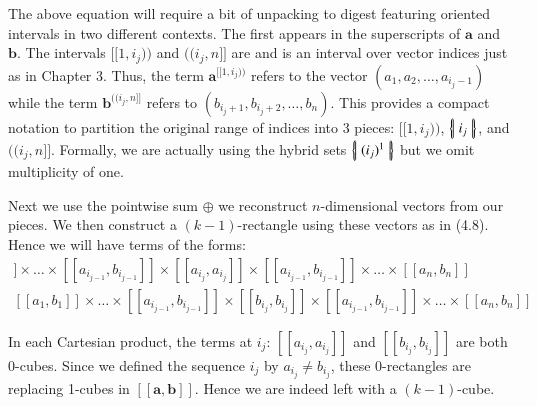 The above equation will require a bit of unpacking to digest featuring oriented intervals in two different contexts.
The first appears in the superscripts of $\boldsymbol{a}$ and $\boldsymbol{b}$. 
The intervals $[\![1, i_j)\!)$ and $(\!(i_j, n]\!]$ are  and is an interval over vector indices just as in Chapter 3.
Thus, the term $\boldsymbol{a}^{[\![1,i_j)\!)}$ refers to the vector $(a_1, a_2, \ldots, a_{i_j-1})$ 
while the term $\boldsymbol{b}^{(\!(i_j,n]\!]}$ refers to $(b_{i_j+1}, b_{i_j+2}, \ldots, b_{n})$.
This provides a compact notation to partition the original range of indices into 3 pieces: $[\![ 1,i_j )\!)$, $\left\{ \! \left| \; i_j \; \right| \! \right\}$, and $(\!(i_j, n]\!]$.
Formally, we are actually using the hybrid sets $\left\{ \! \left| \; (i_j)^1 \; \right| \! \right\}$ but we omit multiplicity of one.


Next we use the pointwise sum $\oplus$ we reconstruct $n$-dimensional vectors from our pieces.
We then construct a $(k-1)$-rectangle using these vectors as in (4.8).
Hence we will have terms of the forms:
\begin{align}
	[\![a_1, b_1]\!]
	\times \ldots \times
	[\![a_{i_{j-1}}, b_{i_{j-1}}]\!]
	\times
	[\![a_{i_j}, a_{i_j}]\!]
	\times
	[\![a_{i_{j-1}}, b_{i_{j-1}}]\!]
	\times \ldots \times
	[\![a_n, b_n]\!]
	\\
	[\![a_1, b_1]\!]
	\times \ldots \times
	[\![a_{i_{j-1}}, b_{i_{j-1}}]\!]
	\times
	[\![b_{i_j}, b_{i_j}]\!]
	\times
	[\![a_{i_{j-1}}, b_{i_{j-1}}]\!]
	\times \ldots \times
	[\![a_n, b_n]\!]
\end{align}


In each Cartesian product, the terms at $i_j$: $[\![a_{i_j}, a_{i_j}]\!]$ and $[\![b_{i_j}, b_{i_j}]\!]$ are both 0-cubes.
Since we defined the sequence $i_j$ by $a_{i_j} \neq b_{i_j}$, 
these 0-rectangles are replacing 1-cubes in $[\![\boldsymbol{a}, \boldsymbol{b}]\!]$.
Hence we are indeed left with a $(k-1)$-cube.




